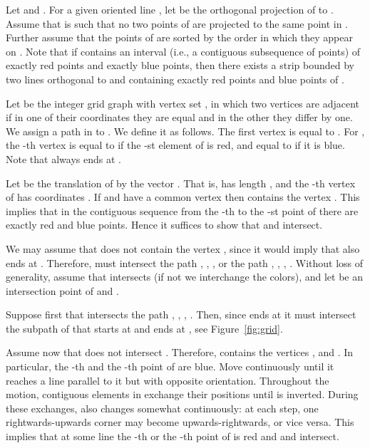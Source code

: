 \documentclass{article}
\def\QED{\ensuremath{{\square}}}
\def\markatright#1{\leavevmode\unskip\nobreak\quad\hspace*{\fill}{#1}}
\newenvironment{proof}
  {\begin{trivlist}\item[\hskip\labelsep{\bf Proof.}]}
  {\markatright{\QED}\end{trivlist}}
\begin{document}
\begin{proof}
Let  and .
For a given oriented line , let  be the orthogonal projection of  to .
Assume that  is such that no two points of  are projected to the same point in . 
Further assume that the points of  are sorted by the order in which they appear on . 
Note that if  contains an interval (i.e., a contiguous subsequence of points) of exactly  red points and exactly  blue points,
then there exists a strip bounded by two lines orthogonal to  and containing exactly  red points and  blue points of .

Let  be the  integer grid graph with vertex set , 
	in which two vertices are adjacent if in one of their coordinates they are equal and in the other they differ by one. 
We assign a path  in  to .
We define it as follows. 
The first vertex  is equal to . 
For , the -th vertex  is equal to  if the -st element of  is red, and equal to   if it is blue.
Note that  always ends at .


Let  be the translation of  by the vector .
That is,  has length , and the -th vertex of  has coordinates . 
If  and  have a common vertex  then  contains the vertex . 
This implies that in the contiguous sequence from the -th to the -st point of  there are exactly  red and  blue points.
Hence it suffices to show that  and  intersect.

We may assume that  does not contain the vertex , since it would imply that  also ends at . 
Therefore,  must intersect the path 
	, , ,  or the path 
	, ,  , .
Without loss of generality, assume that  intersects  (if not we interchange the colors), and let  be an intersection point of  and .

Suppose first that  intersects the path  , ,  , . 
Then, since  ends at  it must intersect the subpath of  that starts at  and ends at , see Figure~\ref{fig:grid}. 

Assume now that  does not intersect .
Therefore,  contains the vertices ,  and  . 
In particular, the -th and the -th point of  are blue. 
Move  continuously until it reaches a line parallel to it but with opposite orientation. 
Throughout the motion, contiguous elements in  exchange their positions until  is inverted. 
During these exchanges,  also changes somewhat continuously: at each step, one rightwards-upwards corner may become upwards-rightwards, or vice versa. 
This implies that at some line  the -th or the -th point of  is red and  and  intersect.
\end{proof}
\end{document}
